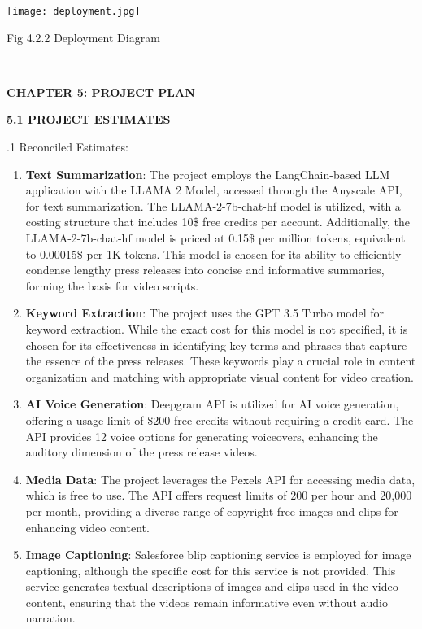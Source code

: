 \documentclass[12pt]{article}
\begin{document}
\noindent \justify \texttt{[image: deployment.jpg]}
\begin{center}
    Fig 4.2.2 Deployment Diagram
\end{center}
\\

\pagebreak{}

\begin{center} \fontsize{14}{14} \textbf{CHAPTER 5: PROJECT PLAN } \end{center}

\justify \textbf{5.1 PROJECT ESTIMATES}

.1 Reconciled Estimates:
\begin{enumerate}
\item \textbf{Text Summarization}: The project employs the LangChain-based LLM application with the LLAMA 2 Model, accessed through the Anyscale API, for text summarization. The LLAMA-2-7b-chat-hf model is utilized, with a costing structure that includes 10\$ free credits per account. Additionally, the LLAMA-2-7b-chat-hf model is priced at 0.15\$ per million tokens, equivalent to 0.00015\$ per 1K tokens. This model is chosen for its ability to efficiently condense lengthy press releases into concise and informative summaries, forming the basis for video scripts.

\item \textbf{Keyword Extraction}: The project uses the GPT 3.5 Turbo model for keyword extraction. While the exact cost for this model is not specified, it is chosen for its effectiveness in identifying key terms and phrases that capture the essence of the press releases. These keywords play a crucial role in content organization and matching with appropriate visual content for video creation.

\item \textbf{AI Voice Generation}: Deepgram API is utilized for AI voice generation, offering a usage limit of \$200 free credits without requiring a credit card. The API provides 12 voice options for generating voiceovers, enhancing the auditory dimension of the press release videos.

\item \textbf{Media Data}: The project leverages the Pexels API for accessing media data, which is free to use. The API offers request limits of 200 per hour and 20,000 per month, providing a diverse range of copyright-free images and clips for enhancing video content.

\item \textbf{Image Captioning}: Salesforce blip captioning service is employed for image captioning, although the specific cost for this service is not provided. This service generates textual descriptions of images and clips used in the video content, ensuring that the videos remain informative even without audio narration.


\end{enumerate}
\end{document}
